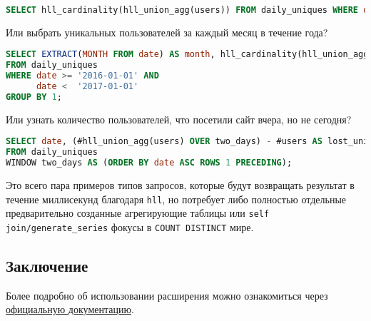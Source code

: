 \begin{lstlisting}[language=SQL,label=lst:pghll5,caption=daily\_uniques за неделю]
SELECT hll_cardinality(hll_union_agg(users)) FROM daily_uniques WHERE date >= '2017-02-20'::date AND date <= '2017-02-26'::date;
\end{lstlisting}

Или выбрать уникальных пользователей за каждый месяц в течение года?

\begin{lstlisting}[language=SQL,label=lst:pghll6,caption=daily\_uniques за каждый месяц]
SELECT EXTRACT(MONTH FROM date) AS month, hll_cardinality(hll_union_agg(users))
FROM daily_uniques
WHERE date >= '2016-01-01' AND
      date <  '2017-01-01'
GROUP BY 1;
\end{lstlisting}

Или узнать количество пользователей, что посетили сайт вчера, но не сегодня?

\begin{lstlisting}[language=SQL,label=lst:pghll7,caption=daily\_uniques за вчера но не сегодня]
SELECT date, (#hll_union_agg(users) OVER two_days) - #users AS lost_uniques
FROM daily_uniques
WINDOW two_days AS (ORDER BY date ASC ROWS 1 PRECEDING);
\end{lstlisting}

Это всего пара примеров типов запросов, которые будут возвращать результат в течение миллисекунд благодаря \lstinline!hll!, но потребует либо полностью отдельные предварительно созданные агрегирующие таблицы или \lstinline!self join/generate_series! фокусы в \lstinline!COUNT DISTINCT! мире.

\subsection{Заключение}

Более подробно об использовании расширения можно ознакомиться через \href{https://github.com/aggregateknowledge/postgresql-hll/blob/master/README.markdown}{официальную документацию}.
